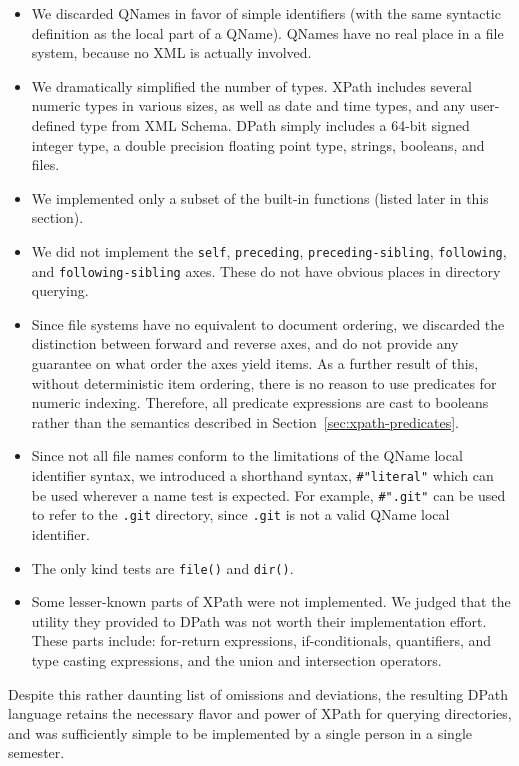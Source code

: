\documentclass{article}
\begin{document}
\begin{itemize}
\item We discarded QNames in favor of simple identifiers (with the same
  syntactic definition as the local part of a QName). QNames have no real place
  in a file system, because no XML is actually involved.
\item We dramatically simplified the number of types. XPath includes several
  numeric types in various sizes, as well as date and time types, and any
  user-defined type from XML Schema. DPath simply includes a 64-bit signed
  integer type, a double precision floating point type, strings, booleans, and
  files.
\item We implemented only a subset of the built-in functions (listed later in
  this section).
\item We did not implement the \texttt{self}, \texttt{preceding},
  \texttt{preceding-sibling}, \texttt{following}, and \texttt{following-sibling}
  axes. These do not have obvious places in directory querying.
\item Since file systems have no equivalent to document ordering, we discarded
  the distinction between forward and reverse axes, and do not provide any
  guarantee on what order the axes yield items. As a further result of this,
  without deterministic item ordering, there is no reason to use predicates for
  numeric indexing. Therefore, all predicate expressions are cast to booleans
  rather than the semantics described in Section~\ref{sec:xpath-predicates}.
\item Since not all file names conform to the limitations of the QName local
  identifier syntax, we introduced a shorthand syntax, \texttt{\#"literal"}
  which can be used wherever a name test is expected. For example,
  \texttt{\#".git"} can be used to refer to the \texttt{.git} directory, since
  \texttt{.git} is not a valid QName local identifier.
\item The only kind tests are \texttt{file()} and \texttt{dir()}.
\item Some lesser-known parts of XPath were not implemented. We judged that the
  utility they provided to DPath was not worth their implementation effort.
  These parts include: for-return expressions, if-conditionals, quantifiers, and
  type casting expressions, and the union and intersection operators.
\end{itemize}

Despite this rather daunting list of omissions and deviations, the resulting
DPath language retains the necessary flavor and power of XPath for querying
directories, and was sufficiently simple to be implemented by a single person in
a single semester.
\end{document}
